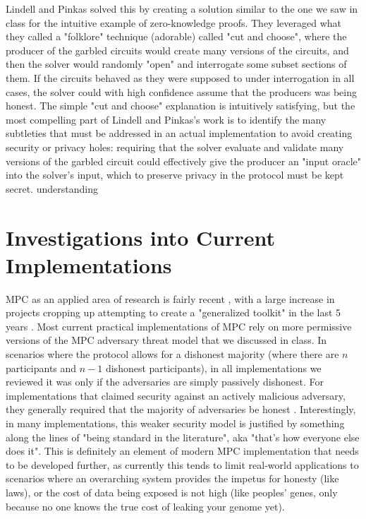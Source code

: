 \documentclass[11pt]{article}
\begin{document}
Lindell and Pinkas solved this by creating a solution similar to the one we saw in class for the intuitive example of zero-knowledge proofs. They leveraged what they called a 
"folklore" technique (adorable) called "cut and choose", where 
the producer of the garbled circuits would create many versions of the circuits, and then the solver would randomly 
"open" and interrogate some subset sections of them. If the circuits behaved as 
they were supposed to under interrogation in all cases, the solver could with high confidence assume that the producers was being honest. 
The simple "cut and choose" explanation is intuitively satisfying, but the most compelling part of 
Lindell and Pinkas's work is to identify the many subtleties that must be addressed in an 
actual implementation to avoid creating security or privacy holes: requiring that the solver evaluate and validate 
many versions of the garbled circuit could effectively give the producer an "input oracle" into the solver's input, which to 
preserve privacy in the protocol must be kept secret.
understanding

\section*{Investigations into Current Implementations}

MPC as an applied area of research is fairly recent \cite{2}, with a large increase in projects cropping up attempting to create a "generalized 
toolkit" in the last 5 years \cite{7, 8, 9, 10, 11}. Most current practical implementations of MPC rely on more permissive versions of the MPC adversary threat model that we discussed in class. In scenarios where 
the protocol allows for a dishonest majority (where there are $n$ participants and $n-1$ dishonest participants), in all implementations we reviewed it was only if the adversaries are simply passively dishonest. For implementations that claimed security 
against an actively malicious adversary, they generally required that the majority of adversaries be honest \cite{7, 8, 9}. Interestingly, in many implementations, 
this weaker security model is justified by something along the lines of "being standard in the literature", aka "that's how everyone else does it". \cite{11} This 
is definitely an element of modern MPC implementation that needs to be developed further, as currently this tends to limit real-world applications to scenarios where 
an overarching system provides the impetus for honesty (like laws), or the cost of data being exposed is not high (like peoples' genes, only because no one knows the true cost of leaking your genome yet).
\end{document}
